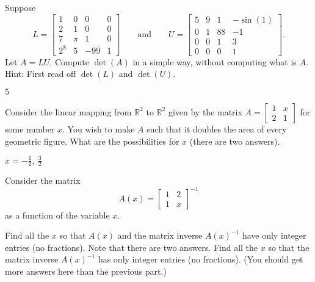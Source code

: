 \begin{exercise}
Suppose
\begin{equation*}
L = \begin{bmatrix}
1 & 0 & 0 & 0 \\
2 & 1 & 0 & 0 \\
7 & \pi & 1 & 0 \\
2^8 & 5 & -99 & 1
\end{bmatrix}
\qquad \text{and} \qquad
U = \begin{bmatrix}
5 & 9 & 1 & -\sin(1) \\
0 & 1 & 88 & -1 \\
0 & 0 & 1 & 3 \\
0 & 0 & 0 & 1
\end{bmatrix} .
\end{equation*}
Let $A = LU$.  Compute $\det(A)$ in a simple way, without computing what is $A$.
Hint: First read off $\det(L)$ and $\det(U)$.
\end{exercise}
\comboSol{%
}
{%
$5$
}

\begin{exercise}
Consider the linear mapping from ${\mathbb R}^2$ to ${\mathbb R}^2$
given by the  matrix
$A = \left[ \begin{smallmatrix}
1 & x \\
2 & 1
\end{smallmatrix} \right]$
for some number $x$.  You wish to make $A$ such that it doubles the area of
every geometric figure.  What are the possibilities for $x$ (there are two
answers).
\end{exercise}
\comboSol{%
}
{%
$x = -\frac{1}{2},\ \frac{3}{2}$
}

\begin{exercise}[challenging]\ansMark%
Consider the matrix
\begin{equation*}
A(x) = \begin{bmatrix}
1 & 2 \\ 1 & x
\end{bmatrix}^{-1}
\end{equation*}
as a function of the variable $x$.
\begin{tasks}
\task Find all the $x$ so that $A(x)$ and the matrix inverse $A(x)^{-1}$
have only integer entries (no fractions). Note that there are two answers.
\task Find all the $x$ so that the matrix inverse $A(x)^{-1}$
has only integer entries (no fractions). (You should get more answers here than the previous part.)
\end{tasks}

\end{exercise}

